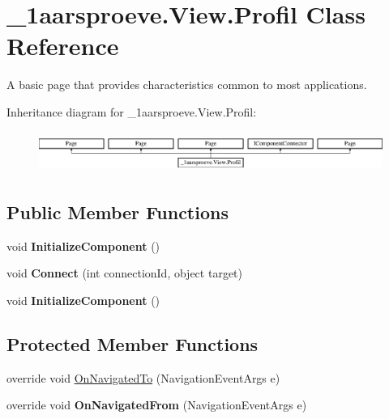 \hypertarget{class__1aarsproeve_1_1_view_1_1_profil}{}\section{\+\_\+1aarsproeve.\+View.\+Profil Class Reference}
\label{class__1aarsproeve_1_1_view_1_1_profil}


A basic page that provides characteristics common to most applications.  


Inheritance diagram for \+\_\+1aarsproeve.\+View.\+Profil\+:\begin{figure}[H]
\begin{center}
\leavevmode
\includegraphics[height=1.357576cm]{class__1aarsproeve_1_1_view_1_1_profil}
\end{center}
\end{figure}
\subsection*{Public Member Functions}
\begin{DoxyCompactItemize}
\item 
\hypertarget{class__1aarsproeve_1_1_view_1_1_profil_a8a49f31d1274ad9f3d7dda340180166b}{}void {\bfseries Initialize\+Component} ()\label{class__1aarsproeve_1_1_view_1_1_profil_a8a49f31d1274ad9f3d7dda340180166b}

\item 
\hypertarget{class__1aarsproeve_1_1_view_1_1_profil_aef76942d2b54a5a91a00c1da9e18fed0}{}void {\bfseries Connect} (int connection\+Id, object target)\label{class__1aarsproeve_1_1_view_1_1_profil_aef76942d2b54a5a91a00c1da9e18fed0}

\item 
\hypertarget{class__1aarsproeve_1_1_view_1_1_profil_a8a49f31d1274ad9f3d7dda340180166b}{}void {\bfseries Initialize\+Component} ()\label{class__1aarsproeve_1_1_view_1_1_profil_a8a49f31d1274ad9f3d7dda340180166b}

\end{DoxyCompactItemize}
\subsection*{Protected Member Functions}
\begin{DoxyCompactItemize}
\item 
override void \hyperlink{class__1aarsproeve_1_1_view_1_1_profil_ab9fe2415e3f9fab8b95a4d10f374b8dd}{On\+Navigated\+To} (Navigation\+Event\+Args e)
\item 
\hypertarget{class__1aarsproeve_1_1_view_1_1_profil_a0104213a42510d9bad8143e22947a0b6}{}override void {\bfseries On\+Navigated\+From} (Navigation\+Event\+Args e)\label{class__1aarsproeve_1_1_view_1_1_profil_a0104213a42510d9bad8143e22947a0b6}

\end{DoxyCompactItemize}
